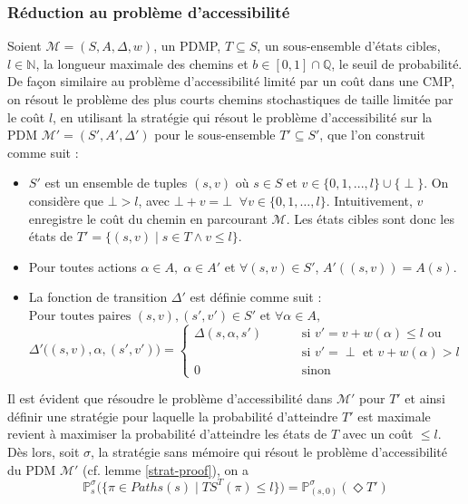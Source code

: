 \documentclass[12pt,a4paper]{report}
\theoremstyle{definition}%
\theoremstyle{remark}
\newcommand{\pr}{\mathbb{P}}
\let\labelitemi\labelitemii
\begin{document}
\subsubsection*{Réduction au problème d'accessibilité}
Soient $\mathcal{M} = (S, A, \Delta, w)$, un PDMP, $T \subseteq S$, un
sous-ensemble d'états cibles, $l \in \mathbb{N}$, la longueur maximale des
chemins et $b \in [0, 1] \cap \mathbb{Q}$, le seuil de probabilité.
De façon similaire au problème d'accessibilité limité par un coût dans une CMP,
on résout le problème
des plus courts chemins stochastiques de taille limitée par le coût $l$,
en utilisant la stratégie qui résout le problème d'accessibilité sur la PDM
$\mathcal{M'} = (S', A', \Delta')$ pour le sous-ensemble $T' \subseteq S'$,
que l'on construit comme suit :
\begin{itemize}
\renewcommand{\labelitemi}{\tiny$\bullet$}
\item $S'$ est un ensemble de tuples $(s, v)$ où $s \in S$ et $v \in \{0, 1, ..., l\} \cup \{\perp\}$.
On considère que $\bot > l$, avec $\bot + v = \bot \; \; \forall v \in \{0, 1, \dots, l\}$.
Intuitivement, $v$ enregistre le coût du chemin en parcourant $\mathcal{M}$.
Les états cibles sont donc les états de
$T' = \{(s, v) \;|\; s \in T \wedge v \leq l \}$.
\item Pour toutes actions $\alpha \in A, \; \alpha \in A'$ et $\forall (s, v) \in S'$, $A'((s, v)) = A(s)$.
\item La fonction de transition $\Delta'$ est définie comme suit :\\
$\text{Pour toutes paires } (s, v), (s', v') \in S' \text{ et } \forall \alpha \in A,$
\[
\Delta'\big((s, v), \alpha, (s', v')\big) =
\begin{cases}
	\Delta(s, \alpha, s') & \quad \quad \text{ si } v' = v + w(\alpha) \leq l \text{ ou}\\
	 & \quad \quad \text{ si } v' = \perp \text{ et } v+w(\alpha) > l \\
	0 & \quad \quad \text{ sinon}
\end{cases}
\]
\end{itemize}
Il est évident que résoudre le problème d'accessibilité dans $\mathcal{M}'$
pour $T'$ et ainsi définir une stratégie pour laquelle la probabilité d'atteindre $T'$ est maximale revient à maximiser la probabilité d'atteindre les états de $T$ avec un coût $\leq l$. Dès lors, soit $\sigma$, la stratégie sans mémoire qui résout le problème
d'accessibilité du PDM $\mathcal{M}'$ (cf. lemme \ref{strat-proof}),
on a
\[
	\pr^{\sigma}_s\big( \{ \pi \in Paths(s) \; | \;  TS^T(\pi) \leq l\}\big)
	=
	\pr^{\sigma}_{(s, 0)}(\Diamond T')
\]
\end{document}
